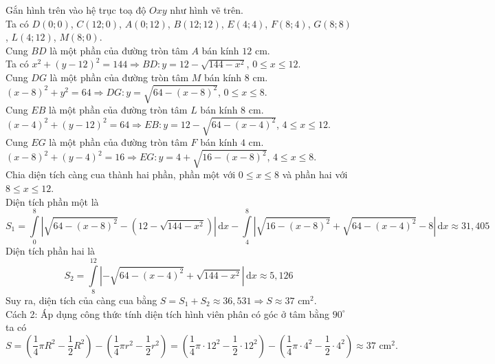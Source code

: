 \begin{ex}
{\begin{center}
		\end{center}
		Gắn hình trên vào hệ trục toạ độ $Oxy$ như hình vẽ trên.\\
		Ta có $D(0;0)$, $C(12;0)$, $A(0;12)$, $B(12;12)$, $E(4;4)$, $F(8;4)$, $G(8;8)$, $L(4;12)$, $M(8;0)$.\\
		Cung $BD$ là một phần của đường tròn tâm $A$ bán kính $12$ cm.\\
		Ta có $x^2+(y-12)^2=144 \Rightarrow BD \colon y=12-\sqrt{144-x^2}$, $0 \le x \le 12$.\\
		Cung $DG$ là một phần của đường tròn tâm $M$ bán kính $8$ cm.\\
		$(x-8)^2+y^2=64 \Rightarrow DG \colon y=\sqrt{64-(x-8)^2}$, $0 \le x \le 8$.\\
		Cung $EB$ là một phần của đường tròn tâm $L$ bán kính $8$ cm.\\
		$(x-4)^2+(y-12)^2=64 \Rightarrow EB \colon y=12-\sqrt{64-(x-4)^2}$, $4 \le x \le 12$.\\
		Cung $EG$ là một phần của đường tròn tâm $F$ bán kính $4$ cm.\\
		$(x-8)^2+(y-4)^2=16 \Rightarrow EG \colon y=4+\sqrt{16-(x-8)^2}$, $4 \le x \le 8$.\\
		Chia diện tích càng cua thành hai phần, phần một với $0 \le x \le 8$ và phần hai với $8 \le x \le 12$.\\
		Diện tích phần một là
		$$S_1 = \displaystyle\int\limits_0^8 \left| \sqrt{64-(x-8)^2} - \left(12-\sqrt{144-x^2}\right) \right| \mathrm{\,d}x - \displaystyle\int\limits_4^8 \left| \sqrt{16-(x-8)^2} + \sqrt{64-(x-4)^2} - 8 \right| \mathrm{\,d}x \approx 31{,}405$$
		Diện tích phần hai là
		$$S_2 = \displaystyle\int\limits_8^{12} \left| -\sqrt{64-(x-4)^2} + \sqrt{144-x^2} \right| \mathrm{\,d}x \approx 5{,}126$$
		Suy ra, diện tích của càng cua bằng $S = S_1+S_2 \approx 36{,}531 \Rightarrow S \approx 37$ cm$^2$.\\
		Cách 2: Áp dụng công thức tính diện tích hình viên phân có góc ở tâm bằng $90^\circ$ ta có
		$$S = \left(\dfrac{1}{4}\pi R^2 - \dfrac{1}{2}R^2\right) - \left(\dfrac{1}{4}\pi r^2 - \dfrac{1}{2}r^2\right) = \left(\dfrac{1}{4}\pi \cdot 12^2 - \dfrac{1}{2} \cdot 12^2\right) - \left(\dfrac{1}{4}\pi \cdot 4^2 - \dfrac{1}{2} \cdot 4^2\right) \approx 37 \text{ cm$^2$}.$$
	}
\end{ex}

